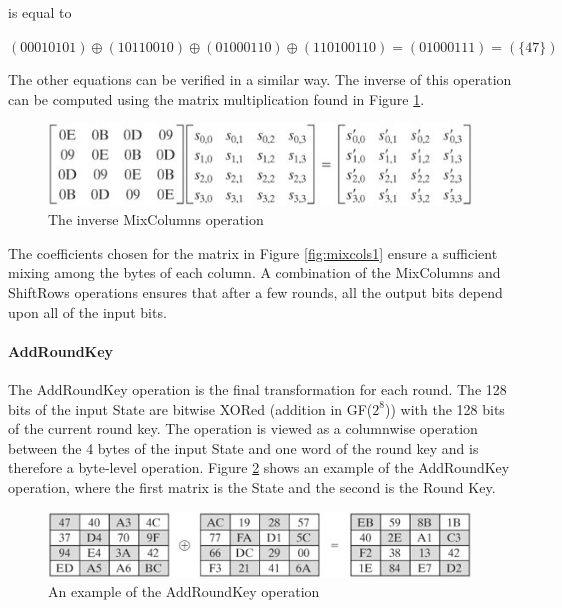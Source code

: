 \documentclass[a4paper,12pt]{report}
\begin{document}
is equal to

\begin{center}
 $ (00010101) \oplus (10110010) \oplus (01000110) \oplus (110100110) = (01000111) = (\{47\})$
\end{center}

The other equations can be verified in a similar way. The inverse of this operation can be computed using the matrix multiplication found in Figure \ref{fig:invmixcols}.

\begin{figure}[htb]
\centering
\includegraphics[scale=0.7]{images/invmixcols.jpg}
\caption{The inverse MixColumns operation}
\label{fig:invmixcols}
\end{figure}

The coefficients chosen for the matrix in Figure \ref{fig:mixcols1} ensure a sufficient mixing among the bytes of each column. A combination of the MixColumns and ShiftRows operations ensures that after a few rounds, all the output bits depend upon all of the input bits. 

\paragraph{AddRoundKey}
The AddRoundKey operation is the final transformation for each round. The 128 bits of the input State are bitwise XORed (addition in GF($2^{8}$)) with the 128 bits of the current round key. The operation is viewed as a columnwise operation between the 4 bytes of the input State and one word of the round key and is therefore a byte-level operation. Figure \ref{fig:addroundkey1} shows an example of the AddRoundKey operation, where the first matrix is the State and the second is the Round Key. 

\begin{figure}[htb]
\centering
\includegraphics[scale=0.7]{images/addroundkey1.jpg}
\caption{An example of the AddRoundKey operation}
\label{fig:addroundkey1}
\end{figure}
\end{document}
